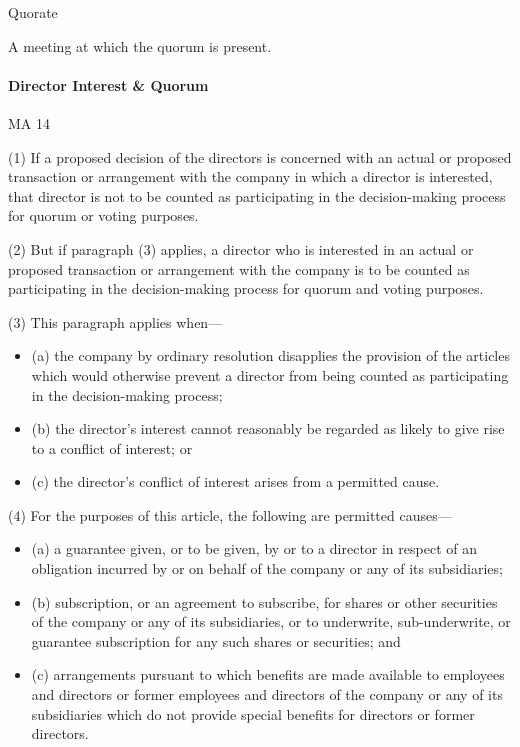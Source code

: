 \documentclass[
]{article}
\providecommand{\tightlist}{%
  \setlength{\itemsep}{0pt}\setlength{\parskip}{0pt}}
\newenvironment{env-12fb5320-b8eb-47b6-8035-097e16242c42}
{
    \savenotes\tcolorbox[blanker,breakable,left=5pt,borderline west={2pt}{-4pt}{green}]
}
{
    \endtcolorbox\spewnotes
}
\newenvironment{env-b20d3313-6f31-4d49-96f7-b40d8676adb1}
{
    \savenotes\tcolorbox[blanker,breakable,left=5pt,borderline west={2pt}{-4pt}{yellow}]
}
{
    \endtcolorbox\spewnotes
}
\begin{document}
\begin{env-b20d3313-6f31-4d49-96f7-b40d8676adb1}

Quorate

A meeting at which the quorum is present.

\end{env-b20d3313-6f31-4d49-96f7-b40d8676adb1}

\hypertarget{director-interest-quorum}{%
\paragraph{Director Interest \& Quorum}\label{director-interest-quorum}}

\begin{env-12fb5320-b8eb-47b6-8035-097e16242c42}

MA 14

(1) If a proposed decision of the directors is concerned with an actual
or proposed transaction or arrangement with the company in which a
director is interested, that director is not to be counted as
participating in the decision-making process for quorum or voting
purposes.

(2) But if paragraph (3) applies, a director who is interested in an
actual or proposed transaction or arrangement with the company is to be
counted as participating in the decision-making process for quorum and
voting purposes.

(3) This paragraph applies when---

\begin{itemize}
\tightlist
\item
  (a) the company by ordinary resolution disapplies the provision of the
  articles which would otherwise prevent a director from being counted
  as participating in the decision-making process;
\item
  (b) the director's interest cannot reasonably be regarded as likely to
  give rise to a conflict of interest; or
\item
  (c) the director's conflict of interest arises from a permitted cause.
\end{itemize}

(4) For the purposes of this article, the following are permitted
causes---

\begin{itemize}
\tightlist
\item
  (a) a guarantee given, or to be given, by or to a director in respect
  of an obligation incurred by or on behalf of the company or any of its
  subsidiaries;
\item
  (b) subscription, or an agreement to subscribe, for shares or other
  securities of the company or any of its subsidiaries, or to
  underwrite, sub-underwrite, or guarantee subscription for any such
  shares or securities; and
\item
  (c) arrangements pursuant to which benefits are made available to
  employees and directors or former employees and directors of the
  company or any of its subsidiaries which do not provide special
  benefits for directors or former directors.
\end{itemize}


\end{env-12fb5320-b8eb-47b6-8035-097e16242c42}
\end{document}
